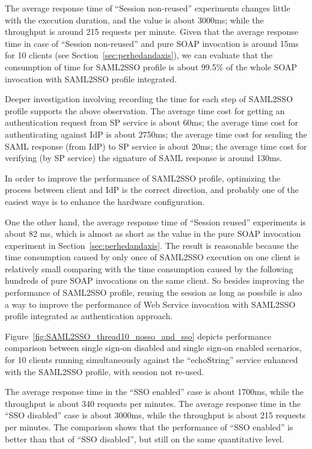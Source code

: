 \documentclass[conference]{IEEEtran}
\begin{document}
The average response time of ``Session non-reused'' experiments changes little
with the execution duration, and the value is about 3000ms; while the throughput is around 215
requests per minute. Given that the average response time in case of ``Session non-reused'' and
pure SOAP invocation is around 15ms for 10 clients (see Section~\ref{sec:perhedandaxis}),
we can evaluate that the consumption of time for SAML2SSO profile is about 99.5\% of
the whole SOAP invocation with SAML2SSO profile integrated. 

Deeper investigation involving recording the time for each step of SAML2SSO profile
supports the above observation. The average time cost for getting an authentication request
from SP service is about 60ms; the average time cost for authenticating against IdP is about
2750ms; the average time cost for sending the SAML response (from IdP) to SP service is
about 20ms; the average time cost for verifying (by SP service) the signature of SAML
response is around 130ms.

In order to improve the performance of SAML2SSO profile, optimizing the process
between client and IdP is the correct direction, and probably one of the easiest ways is
to enhance the hardware configuration.

One the other hand, the average response time of ``Session reused'' experiments
is about 82 ms, which is almost as short as the value in the pure SOAP invocation experiment in
Section~\ref{sec:perhedandaxis}. The result is reasonable because the time consumption
caused by only once of SAML2SSO execution on one client is relatively small comparing with
the time consumption caused by the following hundreds of pure SOAP invocations on the
same client. So besides improving the performance of SAML2SSO profile, reusing 
the session as long as possbile is also a way to improve the performance of 
Web Service invocation with SAML2SSO profile integrated as authentication approach.

Figure~\ref{fig:SAML2SSO_thread10_nosso_and_sso} depicts performance comparison between single 
sign-on disabled and single sign-on enabled scenarios, for 10 clients running simultaneously 
against the ``echoString'' service enhanced with the SAML2SSO profile, with session not re-used.

The average response time in the ``SSO enabled'' case is about 1700ms, while the throughput is about
340 requests per minutes. The average response time in the ``SSO disabled'' case is about 3000ms, while 
the throughput is about 215 requests per minutes. The comparison shows that the performance 
of ``SSO enabled'' is better than that of ``SSO disabled'', but still on the same quantitative
level.
\end{document}
